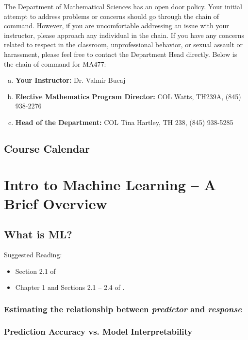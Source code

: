 \documentclass[11pt]{article}
\theoremstyle{plain}
\theoremstyle{definition}
\begin{document}
The Department of Mathematical Sciences has an open door policy. Your initial attempt to address problems or concerns should go through the chain of command. However, if you are uncomfortable addressing an issue with your instructor, please approach any individual in the chain. If you have any concerns related to respect in the classroom, unprofessional behavior, or sexual assault or harassment, please feel free to contact the Department Head directly. Below is the chain of command for MA477:

\begin{enumerate}[a.]
\item {\bf Your Instructor:} Dr. Valmir Bucaj
\item {\bf Elective Mathematics Program Director:} COL Watts, TH239A, (845) 938-2276
\item {\bf Head of the Department:} COL Tina Hartley, TH 238, (845) 938-5285
\end{enumerate}
\newpage
\subsection{Course Calendar}

\begin{figure}
 
\end{figure}

\newpage
\section{Intro to Machine Learning -- A Brief Overview}

\subsection{What is ML?}

Suggested Reading:
\begin{itemize}
\item Section 2.1 of \cite{ISLR} 
\item Chapter 1 and Sections 2.1 -- 2.4 of \cite{wilmott}.
\end{itemize}

\subsubsection{Estimating the relationship between {\it predictor} and {\it response}}

\subsubsection{Prediction Accuracy vs. Model Interpretability}
\end{document}
